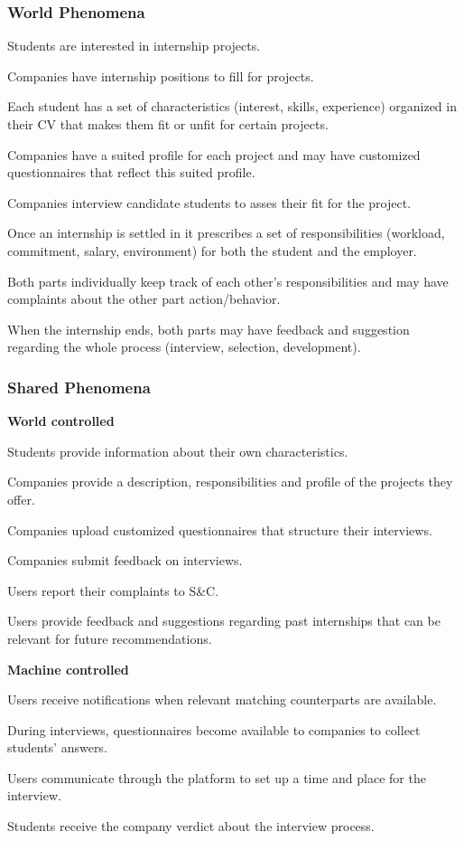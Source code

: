 \subsubsection{World Phenomena}
\begin{enumerate}[label={[WP\arabic*]}]
    \item Students are interested in internship projects.
    \item Companies have internship positions to fill for projects.
    \item Each student has a set of characteristics (interest, skills, experience) organized in their CV that makes them fit or unfit for certain projects.
    \item Companies have a suited profile for each project and may have customized questionnaires that reflect this suited profile.
    \item Companies interview candidate students to asses their fit for the project.
    \item Once an internship is settled in it prescribes a set of responsibilities (workload, commitment, salary, environment) for both the student and the employer.
    \item Both parts individually keep track of each other's responsibilities and may have complaints about the other part action/behavior.
    \item When the internship ends, both parts may have feedback and suggestion regarding the whole process (interview, selection, development).
\end{enumerate}

\subsubsection{Shared Phenomena}
\begin{enumerate}[label={[SP\arabic*]}]
    \item[] \textbf{World controlled}
    \item Students provide information about their own characteristics.
    \item Companies provide a description, responsibilities and profile of the projects they offer.
    \item Companies upload customized questionnaires that structure their interviews.
    \item Companies submit feedback on interviews.
    \item Users report their complaints to S\&C.
    \item Users provide feedback and suggestions regarding past internships that can be relevant for future recommendations.
    \item[] \textbf{Machine controlled}
    \item Users receive notifications when relevant matching counterparts are available.
    \item During interviews, questionnaires become available to companies to collect students’ answers.
    \item Users communicate through the platform to set up a time and place for the interview.
    \item Students receive the company verdict about the interview process.
\end{enumerate}
